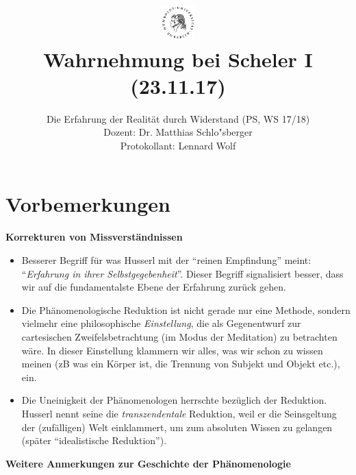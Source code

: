 \documentclass[a4paper, emulatestandardclasses]{scrartcl}
\date{\vspace{-3ex}}
\begin{document}
\title{
    \vspace{-30pt}
	\includegraphics*[width=0.1\textwidth,right]{ErstesSem/images/hu_logo2.png}\\
	\vspace{-10pt}
	Wahrnehmung bei Scheler I (23.11.17)}%
	\subtitle{Die Erfahrung der Realität durch Widerstand (PS, WS 17/18)\\
          Dozent: Dr. Matthias Schlo"sberger\\
          Protokollant: Lennard Wolf}
\maketitle
\vspace{-40pt}

\section*{Vorbemerkungen}
\textbf{Korrekturen von Missverständnissen}

\begin{itemize}
  \item Besserer Begriff für was Husserl mit der "`reinen Empfindung"' meint: "`\emph{Erfahrung in ihrer Selbstgegebenheit}"'. Dieser Begriff signalisiert besser, dass wir auf die fundamentalste Ebene der Erfahrung zurück gehen.
  \item Die Phänomenologische Reduktion ist nicht gerade nur eine Methode, sondern vielmehr eine philosophische \emph{Einstellung}, die als Gegenentwurf zur cartesischen Zweifelsbetrachtung (im Modus der Meditation) zu betrachten wäre. In dieser Einstellung klammern wir alles, was wir schon zu wissen meinen (zB was ein Körper ist, die Trennung von Subjekt und Objekt etc.), ein. 
  \item Die Uneinigkeit der Phänomenologen herrschte bezüglich der Reduktion. Husserl nennt seine die \emph{transzendentale} Reduktion, weil er die Seinsgeltung der (zufälligen) Welt einklammert, um zum absoluten Wissen zu gelangen (später "`idealistische Reduktion"').
\end{itemize}

\noindent\textbf{Weitere Anmerkungen zur Geschichte der Phänomenologie}\newline
\end{document}
